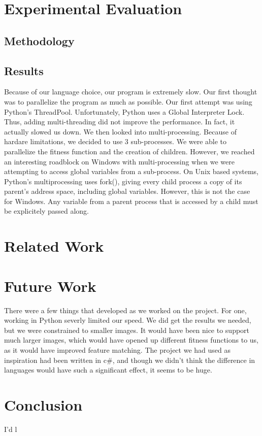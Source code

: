 \documentclass[12pt,letterpaper]{article}
\begin{document}
\section{Experimental Evaluation}

\subsection{Methodology}

\subsection{Results}

Because of our language choice, our program is extremely slow.  Our first thought was to parallelize the program as much as possible.  Our first attempt was using Python's ThreadPool. Unfortunately, Python uses a Global Interpreter Lock.  Thus, adding multi-threading did not improve the performance.  In fact, it actually slowed us down.  We then looked into multi-processing. Because of hardare limitations, we decided to use 3 sub-processes.  We were able to parallelize the fitness function and the creation of children.  However, we reached an interesting roadblock on Windows with multi-processing when we were attempting to access global variables from a sub-process.  On Unix based systems, Python's multiprocessing uses fork(), giving every child process a copy of its parent's address space, including global variables.  However, this is not the case for Windows.  Any variable from a parent process that is accessed by a child must be explicitely passed along.

\section{Related Work}

\section{Future Work}
There were a few things that developed as we worked on the project. For one, working in Python severly limited our speed. We did get the results we needed, but we were constrained to smaller images. It would have been nice to support much larger images, which would have opened up different fitness functions to us, as it would have improved feature matching. The project we had used as inspiration had been written in c\#, and though we didn't think the difference in languages would have such a significant effect, it seems to be huge.

\section{Conclusion}

I'd l
\end{document}
